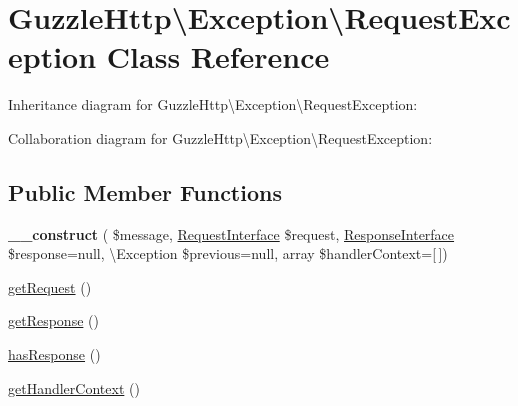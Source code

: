 \hypertarget{classGuzzleHttp_1_1Exception_1_1RequestException}{}\section{Guzzle\+Http\textbackslash{}Exception\textbackslash{}Request\+Exception Class Reference}
\label{classGuzzleHttp_1_1Exception_1_1RequestException}


Inheritance diagram for Guzzle\+Http\textbackslash{}Exception\textbackslash{}Request\+Exception\+:


Collaboration diagram for Guzzle\+Http\textbackslash{}Exception\textbackslash{}Request\+Exception\+:
\subsection*{Public Member Functions}
\begin{DoxyCompactItemize}
\item 
\mbox{\label{classGuzzleHttp_1_1Exception_1_1RequestException_a03abc5465af0644e47d61896baff3b5f}} 
{\bfseries \+\_\+\+\_\+construct} ( \$message, \hyperlink{interfacePsr_1_1Http_1_1Message_1_1RequestInterface}{Request\+Interface} \$request, \hyperlink{interfacePsr_1_1Http_1_1Message_1_1ResponseInterface}{Response\+Interface} \$response=null, \textbackslash{}Exception \$previous=null, array \$handler\+Context=\mbox{[}$\,$\mbox{]})
\item 
\hyperlink{classGuzzleHttp_1_1Exception_1_1RequestException_a89c99519ebf7d1fafaa5d6f9ce51d646}{get\+Request} ()
\item 
\hyperlink{classGuzzleHttp_1_1Exception_1_1RequestException_acfda27bcc9617935534f76b320293846}{get\+Response} ()
\item 
\hyperlink{classGuzzleHttp_1_1Exception_1_1RequestException_a763f6055c3776ccfdedd1078d7a6ab1b}{has\+Response} ()
\item 
\hyperlink{classGuzzleHttp_1_1Exception_1_1RequestException_a8cf15dfc490ea772e5ec1fc13209674d}{get\+Handler\+Context} ()
\end{DoxyCompactItemize}
